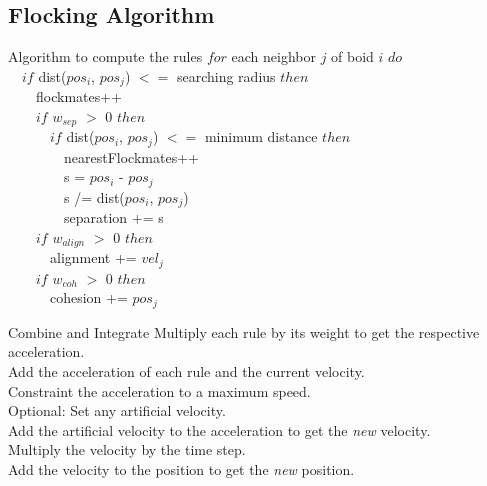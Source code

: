 \documentclass[red]{beamer}
\begin{document}
\subsection{Flocking Algorithm}

\begin{frame}{Algorithm to compute the rules}
	\alert<1>{$for$ each neighbor $j$ of boid $i$ $do$}			\\
	\alert<2>{~~$if$ dist($pos_i$, $pos_j$) $<=$ searching radius $then$}	\\
	\alert<3>{~~~~flockmates++}							\\
	\alert<4>{~~~~$if$ $w_{sep}$ $>$ 0 $then$}					\\
	\alert<5>{~~~~~~$if$ dist($pos_i$, $pos_j$) $<=$ minimum distance $then$}	\\
	\alert<6>{~~~~~~~~nearestFlockmates++}						\\
	\alert<6>{~~~~~~~~s = $pos_i$ - $pos_j$} 					\\
	\alert<6>{~~~~~~~~s /= dist($pos_i$, $pos_j$)} 						\\
	\alert<6>{~~~~~~~~separation += s}							\\
	\alert<7>{~~~~$if$ $w_{align}$ $>$ 0 $then$}				\\
	\alert<7>{~~~~~~alignment += $vel_j$}						\\
	\alert<8>{~~~~$if$ $w_{coh}$ $>$ 0 $then$}					\\
	\alert<8>{~~~~~~cohesion += $pos_j$}						\\
\end{frame}

\begin{frame}{Combine and Integrate}
 	\alert<1>{Multiply each rule by its weight to get the respective acceleration.} 	\\
	\alert<2>{Add the acceleration of each rule and the current velocity.} 	\\
	\alert<3>{Constraint the acceleration to a maximum speed.}			\\ 
	\alert<4>{Optional: Set any artificial velocity.}						\\ 
	\alert<5>{Add the artificial velocity to the acceleration to get the \textit{new} velocity.} \\
	\alert<6>{Multiply the velocity by the time step.}			\\
	\alert<7>{Add the velocity to the position to get the \textit{new} position.}	\\
\end{frame}
\end{document}
